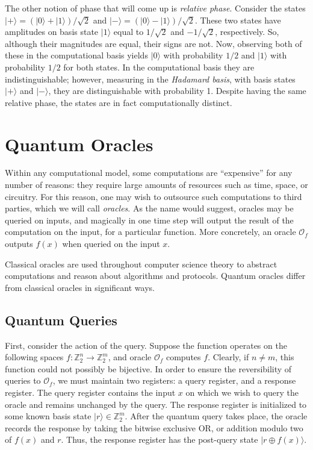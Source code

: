 \documentclass[12pt,twoside]{reedthesis}
\theoremstyle{definition}
\newlength{\arrow}
\newcommand{\Z}{\mathbb{Z}}
\newcommand{\ketz}{\ensuremath{\lvert 0\rangle}\xspace}
\newcommand{\keto}{\ensuremath{\lvert 1\rangle}\xspace}
\newcommand{\ket}[1]{\ensuremath{\lvert #1\rangle}\xspace}
\newcommand{\Hplus}{\ensuremath{\lvert + \rangle}\xspace}
\newcommand{\Hminus}{\ensuremath{\lvert- \rangle}\xspace}
\begin{document}
The other notion of phase that will come up is \textit{relative phase}. Consider the states $\Hplus = (\ketz + \keto)/\sqrt{2}$ and $\Hminus = (\ketz- \keto)/\sqrt{2}$. These two states have amplitudes on basis state $\keto$ equal to $1/\sqrt{2}$ and $-1/\sqrt{2}$, respectively. So, although their magnitudes are equal, their signs are not. Now, observing both of these in the computational basis yields $\ketz$ with probability $1/2$ and $\keto$ with probability $1/2$ for both states. In the computational basis they are indistinguishable; however, measuring in the \textit{Hadamard basis}, with basis states $\Hplus$ and $\Hminus$, they are distinguishable with probability 1. Despite having the same relative phase, the states are in fact computationally distinct.



\section{Quantum Oracles}

Within any computational model, some computations are ``expensive'' for any number of reasons: they require large amounts of resources such as time, space, or circuitry. For this reason, one may wish to outsource such computations to third parties, which we will call \textit{oracles}. As the name would suggest, oracles may be queried on inputs, and magically in one time step will output the result of the computation on the input, for a particular function. More concretely, an oracle $\mathcal{O}_f$ outputs $f(x)$ when queried on the input $x$.

Classical oracles are used throughout computer science theory to abstract computations and reason about algorithms and protocols. Quantum oracles differ  from classical oracles in significant ways. 

\subsection{Quantum Queries}
First, consider the action of the query. Suppose the function operates on the following spaces $f: \Z_2^n \rightarrow \Z_2^m$, and oracle $\mathcal{O}_f$ computes $f$. Clearly, if $n \neq m$, this function could not possibly be bijective. In order to ensure the reversibility of queries to $\mathcal{O}_f$, we must maintain two registers: a query register, and a response register. The query register contains the input $x$ on which we wish to query the oracle and remains unchanged by the query. The response register is initialized to some known basis state $\ket{r} \in \Z_2^m$. After the quantum query takes place, the oracle records the response by taking the bitwise exclusive OR, or addition modulo two of $f(x)$ and $r$. Thus, the response register has the post-query state $\ket{r\oplus f(x)}$. 
\end{document}

